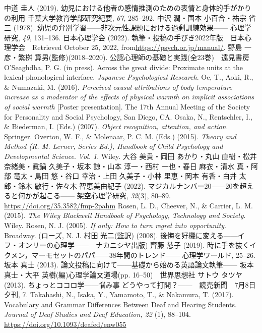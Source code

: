 { 中道 圭人 (2019). 幼児における他者の感情推測のための表情と身体的手がかりの利用 千葉大学教育学部研究紀要, \textit{67}, 285--292.
 中沢 潤・国本 小百合・祐宗 省三 (1978). 幼児の弁別学習——非次元性課題における過剰訓練効果—— 心理学研究, \textit{49}, 131--136.
 日本心理学会 (2022). 執筆・投稿の手びき2022年版　日本心理学会　Retrieved October 25, 2022, from\url{https://psych.or.jp/manual/}.
 野島 一彦・繁桝 算男(監修)(2018--2020).  公認心理師の基礎と実践(全23巻)　遠見書房
 O'Seaghdha, P. G. (in press). Across the great divide: Proximate units at the lexical-phonological interface. \textit{Japanese Psychological Research}.
 Oe, T., Aoki, R., \& Numazaki, M. (2016). \textit{Perceived causal attributions of body temperature increase as a moderator of the effects of physical warmth on implicit associations of social warmth} [Poster presentation]. The 17th Annual Meeting of the Society for Personality and Social Psychology, San Diego, CA.
 Osaka, N., Rentschler, I., \& Biederman, I. (Eds.)  (2007). \textit{Object recognition, attention, and action}. Springer.
 Overton, W. F., \& Molenaar, P. C. M. (Eds.)  (2015). \textit{Theory and Method (R. M. Lerner, Series Ed.), Handbook of Child Psychology and Developmental Science}. \textit{Vol. 1}. Wiley.
 大谷 美貴・岡田 あかり・丸山 直樹・松井 奈緒美・眞鍋 久美子・坂本 諒・山本 淳一・西村 一也・春日 麻衣・清水 真・阿部 竜太・島田 悠・谷口 幸治・上田 久美子・小林 里恵・岡本 有香・白井 太郎・鈴木 敏行・佐々木 智恵美 由紀子 (2022). マジカルナンバー20——20を超えると何かが起こる—— 架空心理学研究, \textit{32}(3), 80--89. \url{https://doi.org/35.3582/fmp-2pahm}
 Rosen, L. D., Cheever, N., \& Carrier, L. M. (2015). \textit{The Wiley Blackwell Handbook of Psychology, Technology and Society}. Wiley.
 Rosen, N. J. (2005). \textit{If only: How to turn regret into opportunity}. Broadway.
(ローズ, N. J. 村田 光二(監訳) (2008). 後悔を好機に変える——イフ・オンリーの心理学——　ナカニシヤ出版)
 齊藤 慈子 (2019). 時に手を抜くイクメン，マーモセットのパパ——38年間のトレンド—— 心理学ワールド, 25--26.
 坂本 真士 (2013). 論文投稿に向けて——基礎から始める英語論文執筆—— 坂本 真士・大平 英樹(編)心理学論文道場(pp. 16--50)　世界思想社
 サトウ タツヤ (2013). ちょっとココロ学——悩み事 どうやって打開？——　読売新聞　7月8日夕刊, 7.
 Takahashi, N., Isaka, Y., Yamamoto, T., \& Nakamura, T. (2017). Vocabulary and Grammar Differences Between Deaf and Hearing Students. \textit{Journal of Deaf Studies and Deaf Education, 22} (1), 88--104. \url{https://doi.org/10.1093/deafed/enw055}
}
